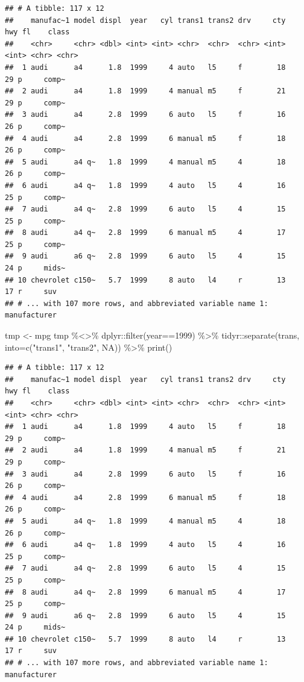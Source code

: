 \documentclass[
]{article}
\newenvironment{Shaded}{\begin{snugshade}}{\end{snugshade}}
\newcommand{\AttributeTok}[1]{\textcolor[rgb]{0.77,0.63,0.00}{#1}}
\newcommand{\ConstantTok}[1]{\textcolor[rgb]{0.00,0.00,0.00}{#1}}
\newcommand{\DecValTok}[1]{\textcolor[rgb]{0.00,0.00,0.81}{#1}}
\newcommand{\FunctionTok}[1]{\textcolor[rgb]{0.00,0.00,0.00}{#1}}
\newcommand{\NormalTok}[1]{#1}
\newcommand{\OtherTok}[1]{\textcolor[rgb]{0.56,0.35,0.01}{#1}}
\newcommand{\SpecialCharTok}[1]{\textcolor[rgb]{0.00,0.00,0.00}{#1}}
\newcommand{\StringTok}[1]{\textcolor[rgb]{0.31,0.60,0.02}{#1}}
\begin{document}
\begin{verbatim}
## # A tibble: 117 x 12
##    manufac~1 model displ  year   cyl trans1 trans2 drv     cty   hwy fl    class
##    <chr>     <chr> <dbl> <int> <int> <chr>  <chr>  <chr> <int> <int> <chr> <chr>
##  1 audi      a4      1.8  1999     4 auto   l5     f        18    29 p     comp~
##  2 audi      a4      1.8  1999     4 manual m5     f        21    29 p     comp~
##  3 audi      a4      2.8  1999     6 auto   l5     f        16    26 p     comp~
##  4 audi      a4      2.8  1999     6 manual m5     f        18    26 p     comp~
##  5 audi      a4 q~   1.8  1999     4 manual m5     4        18    26 p     comp~
##  6 audi      a4 q~   1.8  1999     4 auto   l5     4        16    25 p     comp~
##  7 audi      a4 q~   2.8  1999     6 auto   l5     4        15    25 p     comp~
##  8 audi      a4 q~   2.8  1999     6 manual m5     4        17    25 p     comp~
##  9 audi      a6 q~   2.8  1999     6 auto   l5     4        15    24 p     mids~
## 10 chevrolet c150~   5.7  1999     8 auto   l4     r        13    17 r     suv  
## # ... with 107 more rows, and abbreviated variable name 1: manufacturer
\end{verbatim}

\begin{Shaded}
\begin{Highlighting}[]
\NormalTok{tmp }\OtherTok{\textless{}{-}}\NormalTok{ mpg}
\NormalTok{tmp }\SpecialCharTok{\%\textless{}\textgreater{}\%}
\NormalTok{  dplyr}\SpecialCharTok{::}\FunctionTok{filter}\NormalTok{(year}\SpecialCharTok{==}\DecValTok{1999}\NormalTok{) }\SpecialCharTok{\%\textgreater{}\%}
\NormalTok{  tidyr}\SpecialCharTok{::}\FunctionTok{separate}\NormalTok{(trans, }\AttributeTok{into=}\FunctionTok{c}\NormalTok{(}\StringTok{"trans1"}\NormalTok{, }\StringTok{"trans2"}\NormalTok{, }\ConstantTok{NA}\NormalTok{)) }\SpecialCharTok{\%\textgreater{}\%}
  \FunctionTok{print}\NormalTok{()}
\end{Highlighting}
\end{Shaded}

\begin{verbatim}
## # A tibble: 117 x 12
##    manufac~1 model displ  year   cyl trans1 trans2 drv     cty   hwy fl    class
##    <chr>     <chr> <dbl> <int> <int> <chr>  <chr>  <chr> <int> <int> <chr> <chr>
##  1 audi      a4      1.8  1999     4 auto   l5     f        18    29 p     comp~
##  2 audi      a4      1.8  1999     4 manual m5     f        21    29 p     comp~
##  3 audi      a4      2.8  1999     6 auto   l5     f        16    26 p     comp~
##  4 audi      a4      2.8  1999     6 manual m5     f        18    26 p     comp~
##  5 audi      a4 q~   1.8  1999     4 manual m5     4        18    26 p     comp~
##  6 audi      a4 q~   1.8  1999     4 auto   l5     4        16    25 p     comp~
##  7 audi      a4 q~   2.8  1999     6 auto   l5     4        15    25 p     comp~
##  8 audi      a4 q~   2.8  1999     6 manual m5     4        17    25 p     comp~
##  9 audi      a6 q~   2.8  1999     6 auto   l5     4        15    24 p     mids~
## 10 chevrolet c150~   5.7  1999     8 auto   l4     r        13    17 r     suv  
## # ... with 107 more rows, and abbreviated variable name 1: manufacturer
\end{verbatim}
\end{document}
